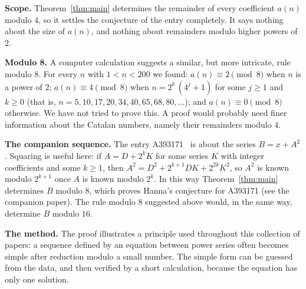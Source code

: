 \documentclass[11pt,a4paper]{article}
\theoremstyle{definition}
\theoremstyle{remark}
\newcommand{\para}[1]{\par\medskip\noindent\textbf{#1}\enspace}
\begin{document}
\para{Scope.} Theorem~\ref{thm:main} determines the remainder of every coefficient $a(n)$ modulo $4$, so it settles
the conjecture of the entry completely. It says nothing about the size of $a(n)$, and nothing about remainders modulo
higher powers of $2$.

\para{Modulo 8.} A computer calculation suggests a similar, but more intricate, rule modulo $8$. For every $n$ with
$1<n<200$ we found: $a(n)\equiv2\pmod8$ when $n$ is a power of $2$; $a(n)\equiv4\pmod8$ when $n=2^k\,(4^j+1)$ for some
$j\ge1$ and $k\ge0$ (that is, $n=5,10,17,20,34,40,65,68,80,\dots$); and $a(n)\equiv0\pmod8$ otherwise. We have not tried
to prove this. A proof would probably need finer information about the Catalan numbers, namely their remainders
modulo $4$.

\para{The companion sequence.} The entry A393171~\cite{oeis171} is about the series $B=x+A^2$. Squaring is useful here:
if $A=D+2^kK$ for some series $K$ with integer coefficients and some $k\ge1$, then $A^2=D^2+2^{k+1}DK+2^{2k}K^2$, so $A^2$
is known modulo $2^{k+1}$ once $A$ is known modulo $2^k$. In this way Theorem~\ref{thm:main} determines $B$ modulo $8$,
which proves Hanna's conjecture for A393171 (see the companion paper). The rule modulo $8$ suggested above would, in the
same way, determine $B$ modulo $16$.

\para{The method.} The proof illustrates a principle used throughout this collection of papers: a sequence defined by
an equation between power series often becomes simple after reduction modulo a small number. The simple form can be
guessed from the data, and then verified by a short calculation, because the equation has only one solution.
\end{document}
